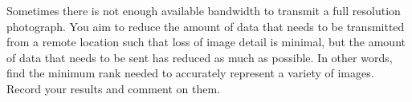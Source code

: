 \begin{problem}
Sometimes there is not enough available bandwidth to transmit a full resolution photograph.
You aim to reduce the amount of data that needs to be transmitted from a remote location such that loss of image detail is minimal, but the amount of data that needs to be sent has reduced as much as possible.
In other words, find the minimum rank needed to accurately represent a variety of images.
Record your results and comment on them.
\end{problem}
